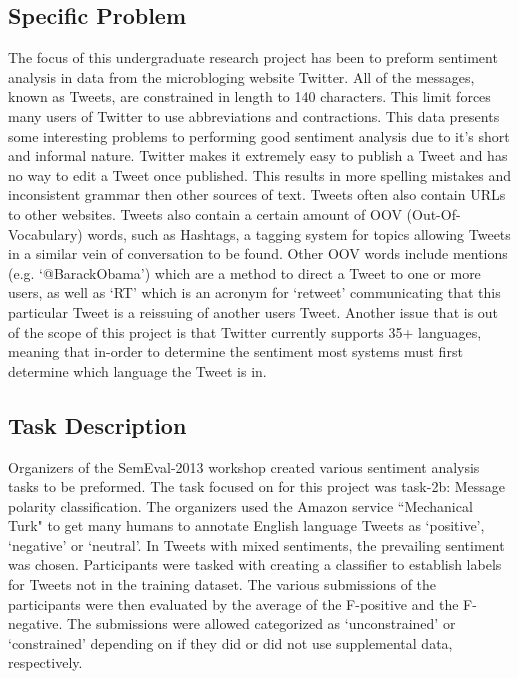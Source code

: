 \documentclass[final,3p,12pt]{elsarticle}
\begin{document}
\subsection{Specific Problem}
\label{ssection:specificproblem}

The focus of this undergraduate research project has been to preform sentiment
analysis in data from the microbloging website Twitter. All of the messages,
known as Tweets, are constrained in length to 140 characters. This limit forces
many users of Twitter to use abbreviations and contractions. This data presents
some interesting problems to performing good sentiment analysis due to it's
short and informal nature. Twitter makes it extremely easy to publish a Tweet
and has no way to edit a Tweet once published. This results in more spelling
mistakes and inconsistent grammar then other sources of text. Tweets often also
contain URLs to other websites. Tweets also contain a certain amount of OOV
(Out-Of-Vocabulary) words, such as Hashtags, a tagging system for topics
allowing Tweets in a similar vein of conversation to be found. Other OOV words
include mentions (e.g. `@BarackObama') which are a method to direct a Tweet to
one or more users, as well as `RT' which is an acronym for `retweet'
communicating that this particular Tweet is a reissuing of another users Tweet.
Another issue that is out of the scope of this project is that Twitter
currently supports 35+ languages, meaning that in-order to determine the
sentiment most systems must first determine which language the Tweet is in.

\subsection{Task Description}
\label{ssection:taskdescription}

Organizers of the SemEval-2013 workshop created various sentiment analysis
tasks to be preformed. The task focused on for this project was task-2b:
Message polarity classification. The organizers used the Amazon service
``Mechanical Turk" to get many humans to annotate English language Tweets as
`positive', `negative' or `neutral'. In Tweets with mixed sentiments, the
prevailing sentiment was chosen. Participants were tasked with creating a
classifier to establish labels for Tweets not in the training dataset. The
various submissions of the participants were then evaluated by the average of
the F-positive and the F-negative. The submissions were allowed categorized as
`unconstrained' or `constrained' depending on if they did or did not use
supplemental data, respectively.
\end{document}
